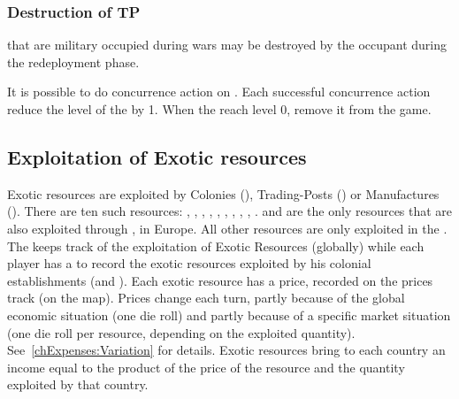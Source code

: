 \subsubsection{Destruction of TP}
\aparag \TP that are military occupied during wars may be destroyed by the
occupant during the redeployment phase.

\aparag It is possible to do concurrence action on \TP. Each successful
concurrence action reduce the level of the \TP by 1.
\bparag When the \TP reach level 0, remove it from the game.






\subsection{Exploitation of Exotic resources}

\label{chThePowers:ResourcesExploitation}
\aparag[Resources] Exotic resources are exploited by Colonies (\COL),
Trading-Posts (\TP) or Manufactures (\MNU). There are ten such resources:
, , , , , , , , , .
\bparag {} and  are the only resources that are also
exploited through \MNU, in Europe. All other resources are only exploited in
the \ROTW.
\bparag The  keeps track of the
exploitation of Exotic Resources (globally) while each player has a
 to record the exotic resources exploited by his
colonial establishments (and \MNU).
\aparag Each exotic resource has a price, recorded on the prices track (on the
\ROTW map).
\bparag Prices change each turn, partly because of the global economic
situation (one die roll) and partly because of a specific market situation
(one die roll per resource, depending on the exploited
quantity). See~\ref{chExpenses:Variation} for details.
\bparag Exotic resources bring to each country an income equal to the product
of the price of the resource and the quantity exploited by that country.

